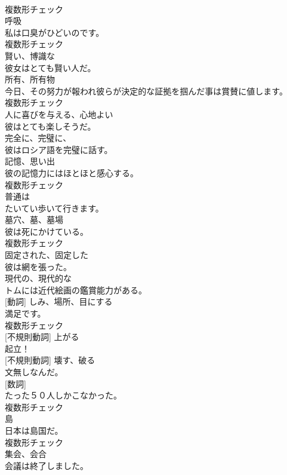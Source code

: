 \documentclass[8pt]{extreport}
\begin{document}
\begin{CJK}{UTF8}{min}
\\	複数形チェック
\\	[名詞]	呼吸	
\\	私は口臭がひどいのです。	
\\	複数形チェック
\\	[形容詞]	賢い、博識な	
\\	彼女はとても賢い人だ。	
\\	[名詞]	所有、所有物	
\\	今日、その努力が報われ彼らが決定的な証拠を掴んだ事は賞賛に値します。	
\\	複数形チェック
\\	[形容詞]	人に喜びを与える、心地よい	
\\	彼はとても楽しそうだ。	
\\	[副詞]	完全に、完璧に、	
\\	彼はロシア語を完璧に話す。	
\\	[名詞]	記憶、思い出	
\\	彼の記憶力にはほとほと感心する。	
\\	複数形チェック
\\	[副詞]	普通は	
\\	たいてい歩いて行きます。	
\\	[名詞]	墓穴、墓、墓場	
\\	彼は死にかけている。	
\\	複数形チェック
\\	[形容詞]	固定された、固定した	
\\	彼は網を張った。	
\\	[形容詞]	現代の、現代的な	
\\	トムには近代絵画の鑑賞能力がある。	
\\	[名詞] [動詞]	しみ、場所、目にする	
\\	満足です。	
\\	複数形チェック
\\	[動詞] [不規則動詞]	上がる	
\\	起立！	
\\	[動詞] [不規則動詞]	壊す、破る	
\\	文無しなんだ。	
\\	[名詞] [数詞]	
\\	たった５０人しかこなかった。	
\\	複数形チェック
\\	[名詞]	島	
\\	日本は島国だ。	
\\	複数形チェック
\\	[名詞]	集会、会合	
\\	会議は終了しました。	

\end{CJK}
\end{document}
